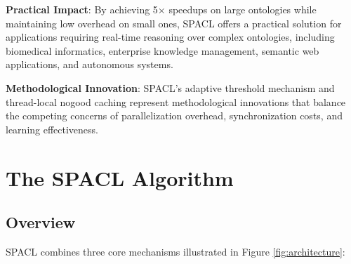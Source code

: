 \documentclass[preprint,12pt]{elsarticle}
\begin{document}
\textbf{Practical Impact}: By achieving 5$\times$ speedups on large ontologies while maintaining low overhead on small ones, SPACL offers a practical solution for applications requiring real-time reasoning over complex ontologies, including biomedical informatics, enterprise knowledge management, semantic web applications, and autonomous systems.

\textbf{Methodological Innovation}: SPACL's adaptive threshold mechanism and thread-local nogood caching represent methodological innovations that balance the competing concerns of parallelization overhead, synchronization costs, and learning effectiveness.

\section{The SPACL Algorithm}
\label{sec:algorithm}

\subsection{Overview}
\label{sec:overview}

SPACL combines three core mechanisms illustrated in Figure \ref{fig:architecture}:
\end{document}
